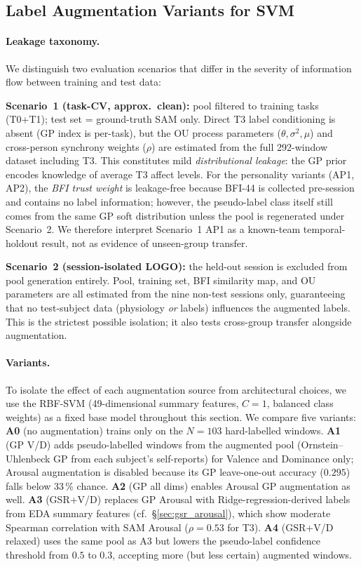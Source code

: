 \documentclass[sigconf,review,anonymous]{acmart}
\begin{document}
\subsection{Label Augmentation Variants for SVM}
\label{sec:aug_variants}

\paragraph{Leakage taxonomy.}
We distinguish two evaluation scenarios that differ in the severity of
information flow between training and test data:

\textbf{Scenario~1 (task-CV, approx.\ clean):} pool filtered to training tasks
(T0+T1); test set = ground-truth SAM only.
Direct T3 label conditioning is absent (GP index is per-task), but the OU
process parameters ($\theta,\sigma^2,\mu$) and cross-person synchrony weights
($\rho$) are estimated from the full 292-window dataset including T3.
This constitutes mild \emph{distributional leakage}: the GP prior encodes
knowledge of average T3 affect levels.
For the personality variants (AP1, AP2), the \emph{BFI trust weight} is
leakage-free because BFI-44 is collected pre-session and contains no label
information; however, the pseudo-label class itself still comes from the same
GP soft distribution unless the pool is regenerated under Scenario~2.
We therefore interpret Scenario~1 AP1 as a known-team temporal-holdout result,
not as evidence of unseen-group transfer.

\textbf{Scenario~2 (session-isolated LOGO):} the held-out session is excluded
from pool generation entirely.
Pool, training set, BFI similarity map, and OU parameters are all estimated
from the nine non-test sessions only, guaranteeing that no test-subject data
(physiology \emph{or} labels) influences the augmented labels.
This is the strictest possible isolation; it also tests cross-group
transfer alongside augmentation.

\paragraph{Variants.}
To isolate the effect of each augmentation source from architectural choices,
we use the RBF-SVM (49-dimensional summary features, $C{=}1$, balanced class
weights) as a fixed base model throughout this section.
We compare five variants:
\textbf{A0} (no augmentation) trains only on the $N{=}103$ hard-labelled windows.
\textbf{A1} (GP V/D) adds pseudo-labelled windows from the augmented pool
(Ornstein--Uhlenbeck GP from each subject's self-reports) for Valence and
Dominance only; Arousal augmentation is disabled because its GP leave-one-out
accuracy ($0.295$) falls below 33\,\% chance.
\textbf{A2} (GP all dims) enables Arousal GP augmentation as well.
\textbf{A3} (GSR+V/D) replaces GP Arousal with Ridge-regression-derived labels
from EDA summary features (cf.\ \S\ref{sec:gsr_arousal}), which show
moderate Spearman correlation with SAM Arousal ($\rho{=}0.53$ for T3).
\textbf{A4} (GSR+V/D relaxed) uses the same pool as A3 but lowers the
pseudo-label confidence threshold from $0.5$ to $0.3$, accepting more
(but less certain) augmented windows.
\end{document}

